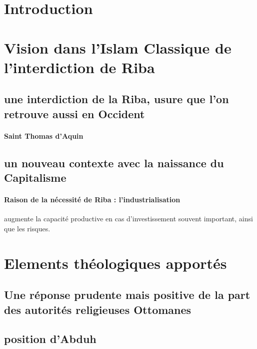 \section{Introduction}

\section{Vision dans l'Islam Classique de l'interdiction de Riba}

\subsection{une interdiction de la Riba, usure que l'on retrouve aussi en Occident}

\paragraph{Saint Thomas d'Aquin}

\subsection{un nouveau contexte avec la naissance du Capitalisme}

\paragraph{Raison de la nécessité de Riba : l'industrialisation} augmente la capacité productive en cas d'investissement souvent important, ainsi que les risques.


\section{Elements théologiques apportés}

\subsection{Une réponse prudente mais positive de la part des autorités religieuses Ottomanes}
\subsection{position d'Abduh}


